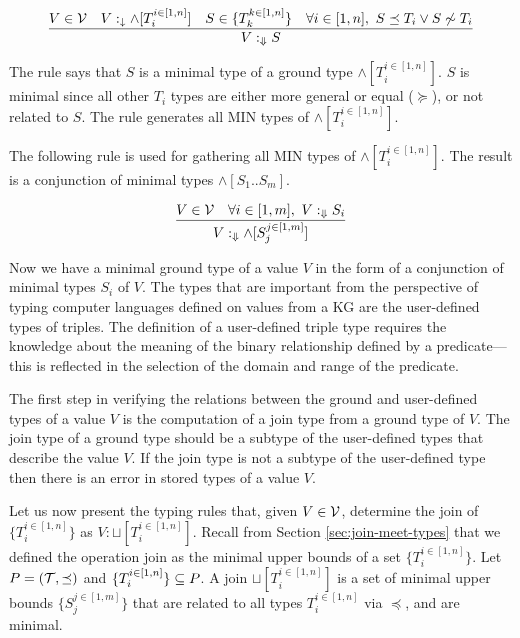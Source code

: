 \documentclass[runningheads]{llncs}
\newcommand{\darr}{\downarrow}
\newcommand{\Darr}{\Downarrow}
\newcommand{\llb}{\llbracket}
\newcommand{\rrb}{\rrbracket}
\newcommand{\V}{{\cal V}}
\newcommand{\T}{{\cal T}}
\newcommand{\nnotes}[1]{\indent\begin{small}-- \emph{#1}\hfill\break\end{small}}
\newcommand{\ennotes}[1]{\indent\begin{small}-- \emph{#1}\hfill\end{small}}
\begin{document}
\begin{equation}
\label{rul:min}
\dfrac{V\in\V\quad\/V:_\darr\land[T_i^{i\in[1,n]}]\quad\/S\in\/\{T_k^{k\in[1,n]}\}\quad\forall\/i\in[1,n],\ S\preceq\/T_i\lor\/S\not\sim\/T_i}
      {V:_{\Darr}S}
\end{equation}

The rule says that $S$ is a minimal type of a ground type
$\land[T_i^{i\in[1,n]}]$. $S$ is minimal since all other $T_i$ types are
either more general or equal ($\succeq$), or not related to $S$. The
rule generates all MIN types of $\land[T_i^{i\in[1,n]}]$.

The following rule is used for gathering all MIN types of
$\land[T_i^{i\in[1,n]}]$. The result is a conjunction of minimal types
$\land[S_1..S_m]$.

\begin{equation}
\label{rul:min-gather}
\dfrac{V\in\V\quad\forall\/i\in[1,m],\ V:_\Darr\/S_i}
      {V:_{\Darr}\land[S_j^{j\in[1,m]}]}
\end{equation}

Now we have a minimal ground type of a value $V$ in the form of a
conjunction of minimal types $S_i$ of $V$. The types that are
important from the perspective of typing computer languages defined on
values from a KG are the user-defined types of triples. The definition
of a user-defined triple type requires the knowledge about the meaning
of the binary relationship defined by a predicate---this is reflected
in the selection of the domain and range of the predicate.

The first step in verifying the relations between the ground and
user-defined types of a value $V$ is the computation of a join type
from a ground type of $V$. The join type of a ground type should be a
subtype of the user-defined types that describe the value $V$. If the
join type is not a subtype of the user-defined type then there is an
error in stored types of a value $V$.

Let us now present the typing rules that, given $V\in\V$,
determine the join of $\{T_i^{i\in[1,n]}\}$ as
$V:\sqcup[T_i^{i\in[1,n]}]$. Recall from Section
\ref{sec:join-meet-types} that we defined the operation join as the
minimal upper bounds of a set $\{T_i^{i\in[1,n]}\}$. Let
$P=(\T,\preceq)$ and $\{T_i^{i\in[1,n]}\}\subseteq\/P$. A join
$\sqcup[T_i^{i\in[1,n]}]$ is a set of minimal upper bounds
$\{S_j^{j\in[1,m]}\}$ that are related to all types $T_i^{i\in[1,n]}$
via $\preceq$, and are minimal.

\end{document}
